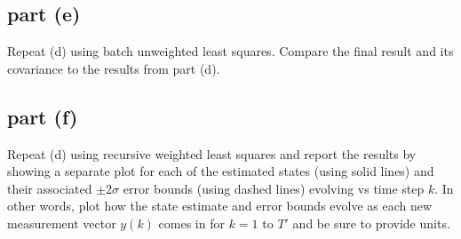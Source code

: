 \documentclass[11pt]{article}
\begin{document}
\subsection*{part (e)}
Repeat (d) using batch unweighted least squares. Compare the final result and its covariance to the results from part (d).

\subsection*{part (f)}
Repeat (d) using recursive weighted least squares and report the results by showing a separate plot for each of the estimated states (using solid lines) and their associated $\pm2\sigma$ error bounds (using dashed lines) evolving vs time step $k$. In other words, plot how the state estimate and error bounds evolve as each new measurement vector $y(k)$ comes in for $k=1$ to $T'$ and be sure to provide units.
\end{document}
